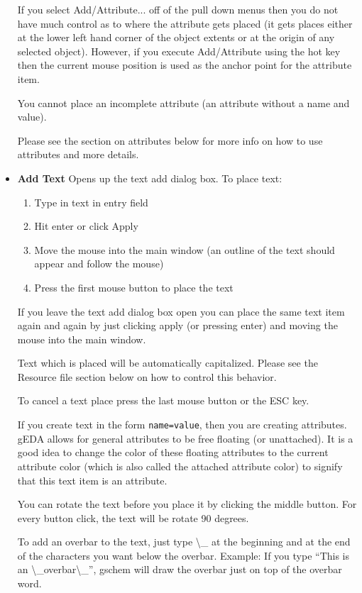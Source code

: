 \documentclass{article}
\begin{document}
\begin{itemize}
 If you select Add/Attribute... off of the pull down menus then you do
 not have much control as to where the attribute gets placed (it gets
 places either at the lower left hand corner of the object extents or
 at the origin of any selected object).  However, if you execute
 Add/Attribute using the hot key then the current mouse position is
 used as the anchor point for the attribute item.
                
 You cannot place an incomplete attribute (an attribute without a name
 and value).
 
 Please see the section on attributes below for more info on how to
 use attributes and more details.
 
\item {\bf Add Text} Opens up the text add dialog box.  To place text:
\begin{enumerate}
\item Type in text in entry field
\item Hit enter or click Apply
\item Move the mouse into the main window (an outline of the text
  should appear and follow the mouse)
\item Press the first mouse button to place the text
\end{enumerate}
If you leave the text add dialog box open you can place the same text
item again and again by just clicking apply (or pressing enter) and
moving the mouse into the main window.

Text which is placed will be automatically capitalized.  Please see
the Resource file section below on how to control this behavior.

To cancel a text place press the last mouse button or the ESC key.

If you create text in the form {\tt name=value}, then you are creating
attributes.  gEDA allows for general attributes to be free floating
(or unattached).  It is a good idea to change the color of these
floating attributes to the current attribute color (which is also
called the attached attribute color) to signify that this text item is
an attribute.

You can rotate the text before you place it by clicking the middle
button.  For every button click, the text will be rotate 90 degrees.

To add an overbar to the text, just type \textbackslash\_ at the beginning and at the end of the characters you want below the overbar. Example: If you type ``This is an \textbackslash\_overbar\textbackslash\_'', gschem will draw the overbar just on top of the overbar word.


\end{itemize}
\end{document}
